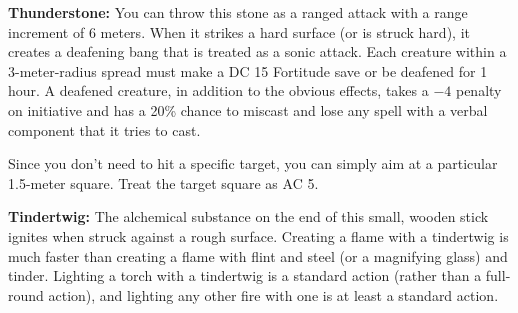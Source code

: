 \textbf{Thunderstone:} You can throw this stone as a ranged attack with a range increment of 6 meters. When it strikes a hard surface (or is struck hard), it creates a deafening bang that is treated as a sonic attack. Each creature within a 3-meter-radius spread must make a DC 15 Fortitude save or be deafened for 1 hour. A deafened creature, in addition to the obvious effects, takes a $-4$ penalty on initiative and has a 20\% chance to miscast and lose any spell with a verbal component that it tries to cast.

Since you don't need to hit a specific target, you can simply aim at a particular 1.5-meter square. Treat the target square as AC 5.

\textbf{Tindertwig:} The alchemical substance on the end of this small, wooden stick ignites when struck against a rough surface. Creating a flame with a tindertwig is much faster than creating a flame with flint and steel (or a magnifying glass) and tinder. Lighting a torch with a tindertwig is a standard action (rather than a full-round action), and lighting any other fire with one is at least a standard action.